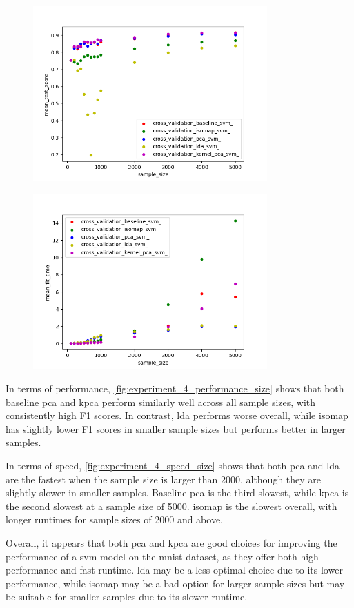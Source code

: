 \begin{figure}[htb!]
    \centering
    \includegraphics[width=0.8\textwidth]{figures/test_score_based_on_size.png}
    \caption{}
    \label{fig:experiment_4_performance_size}
\end{figure}


\begin{figure}[htb!]
    \centering
    \includegraphics[width=0.8\textwidth]{figures/time_based_on_size.png}
    \caption{}
    \label{fig:experiment_4_speed_size}
\end{figure}


In terms of performance, \autoref{fig:experiment_4_performance_size} shows that both baseline \gls{pca} and \gls{kpca} perform similarly well across all sample sizes, with consistently high F1 scores. In contrast, \gls{lda} performs worse overall, while \gls{isomap} has slightly lower F1 scores in smaller sample sizes but performs better in larger samples.

In terms of speed, \autoref{fig:experiment_4_speed_size} shows that both \gls{pca} and \gls{lda} are the fastest when the sample size is larger than 2000, although they are slightly slower in smaller samples. Baseline \gls{pca} is the third slowest, while \gls{kpca} is the second slowest at a sample size of 5000. \gls{isomap} is the slowest overall, with longer runtimes for sample sizes of 2000 and above.

Overall, it appears that both \gls{pca} and \gls{kpca} are good choices for improving the performance of a \gls{svm} model on the \gls{mnist} dataset, as they offer both high performance and fast runtime. \gls{lda} may be a less optimal choice due to its lower performance, while \gls{isomap} may be a bad option for larger sample sizes but may be suitable for smaller samples due to its slower runtime.
